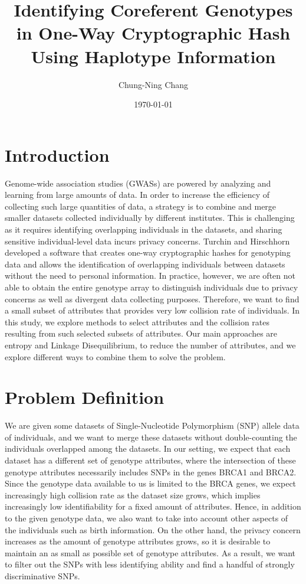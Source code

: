 \documentclass[14pt, oneside]{article}   	%
\title{Identifying Coreferent Genotypes in One-Way Cryptographic Hash Using Haplotype Information}
\author{Chung-Ning Chang}
\date{\today}							%
\begin{document}
\maketitle

\section{Introduction}
Genome-wide association studies (GWASs) are powered by analyzing and learning from large amounts of data.
In order to increase the efficiency of collecting such large quantities of data,
a strategy is to combine and merge smaller datasets collected individually by different institutes.
This is challenging as it requires identifying overlapping individuals in the datasets,
and sharing sensitive individual-level data incurs privacy concerns.
Turchin and Hirschhorn \cite{turchin2012gencrypt} developed a software that creates one-way cryptographic hashes for genotyping data
and allows the identification of overlapping individuals between datasets without the need to personal information.
In practice, however, we are often not able to obtain the entire genotype array to distinguish individuals
due to privacy concerns as well as divergent data collecting purposes.
Therefore, we want to find a small subset of attributes that provides very low collision rate of individuals.
In this study, we explore methods to select attributes and the collision rates resulting from such selected subsets of attributes.
Our main approaches are entropy and Linkage Disequilibrium, to reduce the number of attributes,
and we explore different ways to combine them to solve the problem.

\section{Problem Definition}
We are given some datasets of Single-Nucleotide Polymorphism (SNP) allele data of individuals,
and we want to merge these datasets without double-counting the individuals overlapped among the datasets.
In our setting, we expect that each dataset has a different set of genotype attributes,
where the intersection of these genotype attributes necessarily includes SNPs in the genes BRCA1 and BRCA2.
\\
Since the genotype data available to us is limited to the BRCA genes,
we expect increasingly high collision rate as the dataset size grows,
which implies increasingly low identifiability for a fixed amount of attributes.
Hence, in addition to the given genotype data, we also want to take into account other aspects of the individuals such as birth information.
%
On the other hand, the privacy concern increases as the amount of genotype attributes grows,
so it is desirable to maintain an as small as possible set of genotype attributes.
As a result, we want to filter out the SNPs with less identifying ability and find a handful of strongly discriminative SNPs.
\end{document}
